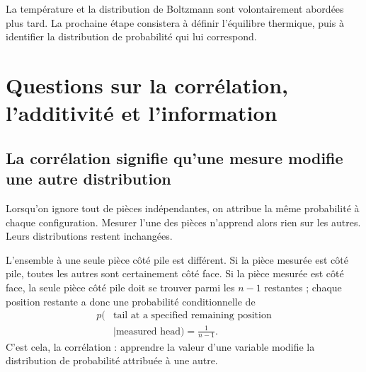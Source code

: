 \begin{classroomqa}
\end{classroomqa}

La température et la distribution de Boltzmann sont volontairement abordées plus tard. La prochaine étape consistera à définir l’équilibre thermique, puis à identifier la distribution de probabilité qui lui correspond.

\section{Questions sur la corrélation, l’additivité et l’information}

\subsection{La corrélation signifie qu’une mesure modifie une autre distribution}

Lorsqu’on ignore tout de pièces indépendantes, on attribue la même probabilité à chaque configuration. Mesurer l’une des pièces n’apprend alors rien sur les autres. Leurs distributions restent inchangées.

L’ensemble à une seule pièce côté pile est différent. Si la pièce mesurée est côté pile, toutes les autres sont certainement côté face. Si la pièce mesurée est côté face, la seule pièce côté pile doit se trouver parmi les \(n-1\) restantes ; chaque position restante a donc une probabilité conditionnelle de
\begin{equation}
\begin{aligned}
 p(&\text{tail at a specified remaining position}\\
   &\mid\text{measured head})=\frac{1}{n-1}.
\end{aligned}
 \label{eq:sm1-conditional-tail}
\end{equation}
C’est cela, la corrélation : apprendre la valeur d’une variable modifie la distribution de probabilité attribuée à une autre.

\begin{classroomqa}
\end{classroomqa}

